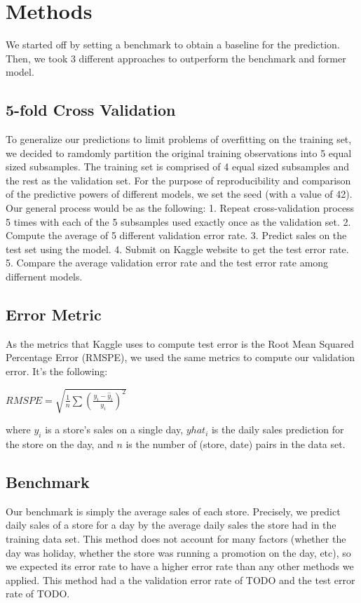 \documentclass[letterpaper,twocolumn,10pt]{article}
\begin{document}



\section{Methods}
We started off by setting a benchmark to obtain a baseline for the prediction. Then, we took 3 different approaches to outperform the benchmark and former model.  

\subsection{5-fold Cross Validation} %
To generalize our predictions to limit problems of overfitting on the training set, we decided to ramdomly partition the original training observations into 5 equal sized subsamples. The training set is comprised of 4 equal sized subsamples and the rest as the validation set. For the purpose of reproducibility and comparison of the predictive powers of different models, we set the seed (with a value of 42). Our general process would be as the following:
1. Repeat cross-validation process 5 times with each of the 5 subsamples used exactly once as the validation set.
2. Compute the average of 5 different validation error rate. 
3. Predict sales on the test set using the model. 
4. Submit on Kaggle website to get the test error rate.
5. Compare the average validation error rate and the test error rate among differnent models.


\subsection{Error Metric}
As the metrics that Kaggle uses to compute test error is the Root Mean Squared Percentage Error (RMSPE), we used the same metrics to compute our validation error. It's the following:

$RMSPE = \sqrt{\frac{1}{n} \sum {(\frac{y_i - \hat y_i}{y_i})}^2}$

where ${y_i}$ is a store's sales on a single day, ${yhat_i}$ is the daily sales prediction for the store on the day, and ${n}$ is the number of (store, date) pairs in the data set. 

\subsection{Benchmark}
Our benchmark is simply the average sales of each store. Precisely, we predict daily sales of a store for a day by the average daily sales the store had in the training data set. This method does not account for many factors (whether the day was holiday, whether the store was running a promotion on the day, etc), so we expected its error rate to have a higher error rate than any other methods we applied. This method had a the validation error rate of TODO and the test error rate of TODO. 
\end{document}

